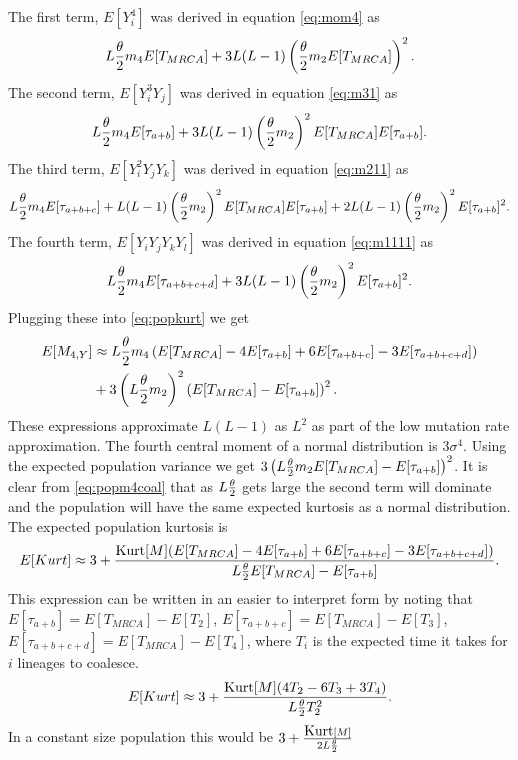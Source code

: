 The first term, $E[Y_i^4]$ was derived in equation \eqref{eq:mom4} as
\begin{equation*}
  L\frac{\theta}{2} m_4 E[T_{MRCA}] + 3L(L-1)\left( \frac{\theta}{2} m_2 E[T_{MRCA}] \right)^2.
\end{equation*}
The second term, $E[Y_i^3Y_j]$ was derived in equation \eqref{eq:m31} as
\begin{equation*}
  L \frac{\theta}{2} m_4 E[\tau_{a+b}] + 3L(L-1) \left(\frac{\theta}{2} m_2\right)^2 E[T_{MRCA}]E[\tau_{a+b}].
\end{equation*}
The third term, $E[Y_i^2Y_jY_k]$ was derived in equation \eqref{eq:m211} as
\begin{equation*}
  L \frac{\theta}{2} m_4 E[\tau_{a+b+c}] + L(L-1)\left(\frac{\theta}{2} m_2\right)^2E[T_{MRCA}]E[\tau_{a+b}] +
  2L(L-1) \left(\frac{\theta}{2} m_2\right)^2E[\tau_{a+b}]^2.
\end{equation*}
The fourth term, $E[Y_iY_jY_kY_l]$ was derived in equation \eqref{eq:m1111} as
\begin{equation*}
  L \frac{\theta}{2} m_4 E[\tau_{a+b+c+d}] + 3L(L-1)\left(\frac{\theta}{2} m_2\right)^2E[\tau_{a+b}]^2.
\end{equation*}
Plugging these into \eqref{eq:popkurt} we get
\begin{align}
  \label{eq:popm4coal}
  E[M_{4,Y}] &\approx L \frac{\theta}{2} m_4 \left( E[T_{MRCA}] - 4E[\tau_{a+b}] + 6E[\tau_{a+b+c}] -3E[\tau_{a+b+c+d}] \right)\nonumber \\
  &+ 3\left( L \frac{\theta}{2} m_2 \right)^2\left(E[T_{MRCA}]- E[\tau_{a+b}]\right)^2.
\end{align}
These expressions approximate $L(L-1)$ as $L^2$ as part of the low mutation rate
approximation. The fourth central moment of a normal distribution is
$3\sigma^4$. Using the expected population variance we get $3\left(L\frac{\theta}{2} m_2
E[T_{MRCA}]- E[\tau_{a+b}]\right)^2$. It is clear from \eqref{eq:popm4coal} that
as $L\frac{\theta}{2}$ gets large the second term will dominate and the population will have
the same expected kurtosis as a normal distribution. The expected population kurtosis
is
\begin{equation*}
  E[Kurt] \approx 3 + \frac{\mbox{Kurt}[M]( E[T_{MRCA}] - 4E[\tau_{a+b}] +
    6E[\tau_{a+b+c}] -3E[\tau_{a+b+c+d}])}{L \frac{\theta}{2} E[T_{MRCA}]- E[\tau_{a+b}]}.
\end{equation*}
This expression can be written in an easier to interpret form by noting that
$E[\tau_{a+b}]=E[T_{MRCA}] - E[T_2]$, $E[\tau_{a+b+c}]=E[T_{MRCA}] - E[T_3]$,
$E[\tau_{a+b+c+d}]=E[T_{MRCA}] - E[T_4]$, where $T_i$ is the expected time it
takes for $i$ lineages to coalesce.
\begin{equation}
  \label{eq:popkurtcoal}
  E[Kurt] \approx 3 + \frac{\mbox{Kurt}[M]( 4T_2 - 6T_3 + 3T_4)}{L \frac{\theta}{2} T_2^2}.
\end{equation}
In a constant size population this would be $3 + \frac{\mbox{Kurt}[M]}{2L\frac{\theta}{2}}$
